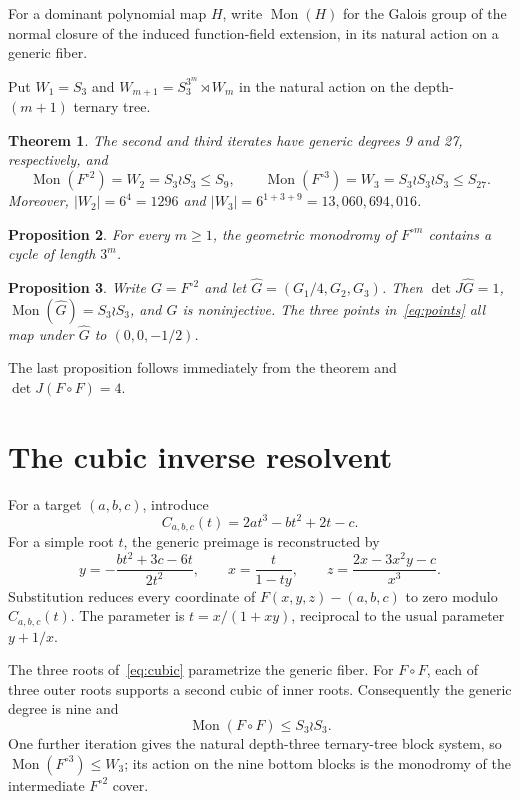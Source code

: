 \documentclass[11pt]{article}
\newtheorem{theorem}{Theorem}
\newtheorem{proposition}[theorem]{Proposition}
\newcommand{\Mon}{\operatorname{Mon}}
\begin{document}
For a dominant polynomial map $H$, write $\Mon(H)$ for the Galois group of
the normal closure of the induced function-field extension, in its natural
action on a generic fiber.

Put $W_1=S_3$ and
$W_{m+1}=S_3^{3^m}\rtimes W_m$ in the natural action on the depth-$(m+1)$
ternary tree.

\begin{theorem}\label{thm:main}
The second and third iterates have generic degrees 9 and 27, respectively,
and
\[
\Mon(F^{\circ2})=W_2=S_3\wr S_3\leq S_9,
\qquad
\Mon(F^{\circ3})=W_3=S_3\wr S_3\wr S_3\leq S_{27}.
\]
Moreover, $|W_2|=6^4=1296$ and
$|W_3|=6^{1+3+9}=13{,}060{,}694{,}016$.
\end{theorem}

\begin{proposition}\label{prop:iterates}
For every $m\geq1$, the geometric monodromy of $F^{\circ m}$ contains a cycle
of length $3^m$.
\end{proposition}

\begin{proposition}\label{prop:normalized}
Write $G=F^{\circ2}$ and let $\widehat G=(G_1/4,G_2,G_3)$. Then
$\det J\widehat G=1$,
$\Mon(\widehat G)=S_3\wr S_3$, and $\widehat G$ is noninjective. The three
points in~\eqref{eq:points} all map under $\widehat G$ to $(0,0,-1/2)$.
\end{proposition}

The last proposition follows immediately from the theorem and
$\det J(F\circ F)=4$.

\section{The cubic inverse resolvent}

For a target $(a,b,c)$, introduce
\begin{equation}
C_{a,b,c}(t)=2at^3-bt^2+2t-c.
\label{eq:cubic}
\end{equation}
For a simple root $t$, the generic preimage is reconstructed by
\begin{equation}
y=-\frac{bt^2+3c-6t}{2t^2},\qquad
x=\frac{t}{1-ty},\qquad
z=\frac{2x-3x^2y-c}{x^3}.
\label{eq:reconstruct}
\end{equation}
Substitution reduces every coordinate of $F(x,y,z)-(a,b,c)$ to zero modulo
$C_{a,b,c}(t)$. The parameter is $t=x/(1+xy)$, reciprocal to the usual
parameter $y+1/x$.

The three roots of~\eqref{eq:cubic} parametrize the generic fiber. For
$F\circ F$, each of three outer roots supports a second cubic of inner roots.
Consequently the generic degree is nine and
\begin{equation}
\Mon(F\circ F)\leq S_3\wr S_3.
\label{eq:upper}
\end{equation}
One further iteration gives the natural depth-three ternary-tree block system,
so $\Mon(F^{\circ3})\leq W_3$; its action on the nine bottom blocks is the
monodromy of the intermediate $F^{\circ2}$ cover.
\end{document}
